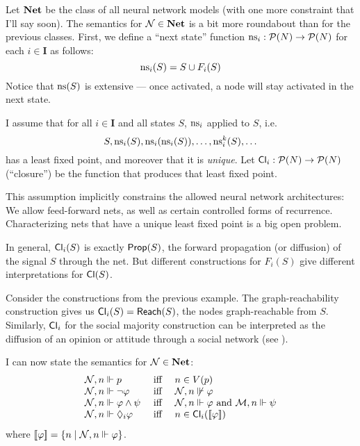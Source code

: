 \documentclass[letterpaper]{article}
\begin{document}
Let $\textrm{\textbf{Net}}$ be the class of all neural network models (with one more constraint that I'll say soon).  The semantics for $\mathcal{N} \in \textrm{\textbf{Net}}$ is a bit more roundabout than for the previous classes.  First, we define a ``next state'' function $\mathrm{ns}_i : \mathcal{P}(N) \to \mathcal{P}(N)$ for each $i \in \textbf{I}$ as follows:
\[
    \mathrm{ns}_i(S) = S \cup F_i(S)
\]
Notice that $\mathrm{ns}(S)$ is extensive --- once activated, a node will stay activated in the next state.

\begin{postulate*}
    I assume that for all $i \in \textbf{I}$ and all states $S$, $\mathrm{ns}_i$ applied to $S$, i.e.
    \[
        S, \mathrm{ns}_i(S), \mathrm{ns}_i(\mathrm{ns}_i(S)), \ldots, \mathrm{ns}^k_i(S), \ldots
    \]
    has a least fixed point, and moreover that it is \emph{unique}.  Let $\mathsf{Cl}_i : \mathcal{P}(N) \to \mathcal{P}(N)$ (``closure'') be the function that produces that least fixed point.
\end{postulate*}
This assumption implicitly constrains the allowed neural network architectures: We allow feed-forward nets, as well as certain controlled forms of recurrence.  Characterizing nets that have a unique least fixed point is a big open problem.

\begin{example*}
    In general, $\mathsf{Cl}_i(S)$ is exactly $\mathsf{Prop}(S)$, the forward propagation (or diffusion) of the signal $S$ through the net.  But different constructions for $F_i(S)$ give different interpretations for $\mathsf{Cl}(S)$.  
    
    Consider the constructions from the previous example.  The graph-reachability construction gives us $\mathsf{Cl}_i(S) = \mathsf{Reach}(S)$, the nodes graph-reachable from $S$.  Similarly, $\mathsf{Cl}_i$ for the social majority construction can be interpreted as the diffusion of an opinion or attitude through a social network (see \cite{baltag2019socialnetworks}).
\end{example*}

I can now state the semantics for $\mathcal{N} \in \textrm{\textbf{Net}}$:
\[
\begin{array}{lcl}
    \mathcal{N}, n \Vdash p & \mbox{ iff } & n \in V(p)\\
    \mathcal{N}, n \Vdash \neg \varphi & \mbox{ iff } & \mathcal{N}, n \not \Vdash \varphi\\
    \mathcal{N}, n \Vdash \varphi \land \psi & \mbox{ iff } & \mathcal{N}, n \Vdash \varphi \mbox{ and } \mathcal{M}, n \Vdash \psi\\
    \mathcal{N}, n \Vdash \Diamond_i \varphi & \mbox{ iff } & 
    n \in \mathsf{Cl}_i([\![\mbox{\em $ \varphi $\/}]\!])
\end{array}
\]
where $[\![\mbox{\em $ \varphi $\/}]\!] = \{ n \mid \mathcal{N}, n \Vdash \varphi \}$.  
\end{document}
